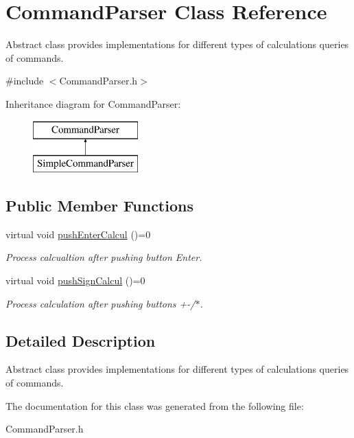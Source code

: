 \hypertarget{class_command_parser}{}\section{Command\+Parser Class Reference}
\label{class_command_parser}


Abstract class  provides implementations for different types of calculations queries of commands.  




{\ttfamily \#include $<$Command\+Parser.\+h$>$}

Inheritance diagram for Command\+Parser\+:\begin{figure}[H]
\begin{center}
\leavevmode
\includegraphics[height=2.000000cm]{class_command_parser}
\end{center}
\end{figure}
\subsection*{Public Member Functions}
\begin{DoxyCompactItemize}
\item 
\hypertarget{class_command_parser_a83641f98a2d06b36676af86e30974a3a}{}virtual void \hyperlink{class_command_parser_a83641f98a2d06b36676af86e30974a3a}{push\+Enter\+Calcul} ()=0\label{class_command_parser_a83641f98a2d06b36676af86e30974a3a}

\begin{DoxyCompactList}\small\item\em Process calcualtion after pushing button Enter. \end{DoxyCompactList}\item 
\hypertarget{class_command_parser_a1c31dbab30dc098e1f722182030e5beb}{}virtual void \hyperlink{class_command_parser_a1c31dbab30dc098e1f722182030e5beb}{push\+Sign\+Calcul} ()=0\label{class_command_parser_a1c31dbab30dc098e1f722182030e5beb}

\begin{DoxyCompactList}\small\item\em Process calculation after pushing buttons +-\//$\ast$. \end{DoxyCompactList}\end{DoxyCompactItemize}


\subsection{Detailed Description}
Abstract class  provides implementations for different types of calculations queries of commands. 

The documentation for this class was generated from the following file\+:\begin{DoxyCompactItemize}
\item 
Command\+Parser.\+h\end{DoxyCompactItemize}
